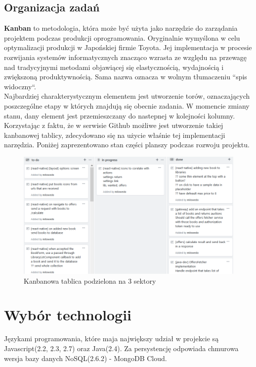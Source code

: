 \subsection{Organizacja zadań}
\textbf{Kanban} to metodologia, która może być użyta jako narzędzie do zarządania projektem podczas produkcji oprogramowania. Oryginalnie wymyślona w celu optymalizacji produkcji w Japońskiej firmie Toyota. Jej implementacja w procesie rozwijania systemów informatycznych znacząco wzrasta ze względu na przewagę nad tradycyjnymi metodami objawiącej się elastycznością, wydajnością i zwiększoną produktywnością. Sama nazwa oznacza w wolnym tłumaczeniu ``spis widoczny``.\cite{kanban}\\ Najbardziej charakterystycznym elementem jest utworzenie torów, oznaczających poszczególne etapy w których znajdują się obecnie zadania. W momencie zmiany stanu, dany element jest przemieszczany do nastepnej w kolejności kolumny.\\
Korzystając z faktu, że w serwisie Github możliwe jest utworzenie takiej kanbanowej tablicy, zdecydowano się na użycie właśnie tej implementacji narzędzia. Poniżej zaprezentowano stan części planszy podczas rozwoju projektu.
\begin{figure}[H]
	\centering
	\includegraphics[width=\linewidth]{kanban.png}
	\caption{Kanbanowa tablica podzielona na 3 sektory}
\end{figure}

\newpage
\section{Wybór technologii}
Językami programowania, które maja największy udział w projekcie są Javascript(2.2, 2.3, 2.7) oraz Java(2.4). Za persystencję odpowiada chmurowa wersja bazy danych NoSQL(2.6.2) - MongoDB Cloud.\\

